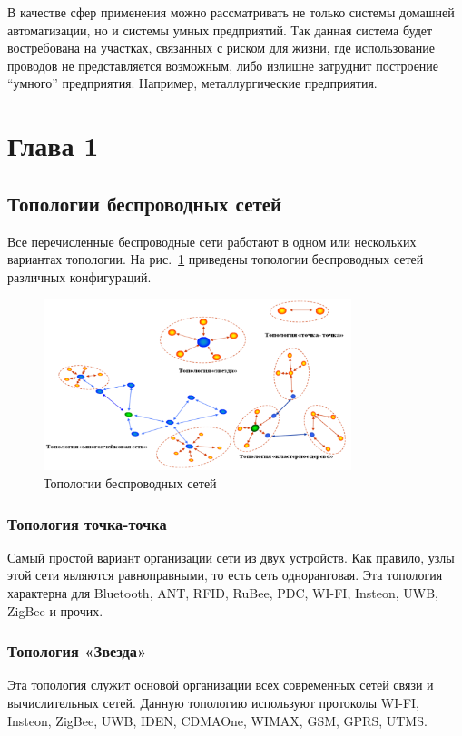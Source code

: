 \documentclass[a4paper,12pt]{article}
\begin{document}
В качестве сфер применения можно рассматривать не только системы домашней автоматизации, но и системы умных предприятий. Так данная система будет востребована на участках, связанных с риском для жизни, где использование проводов не представляется возможным, либо излишне затруднит построение “умного” предприятия. Например, металлургические предприятия.

\newpage

\section{Глава 1}

\subsection{Топологии беспроводных сетей}
Все перечисленные беспроводные сети работают в одном или нескольких вариантах
топологии. На рис.~\ref{fig:topologies} приведены топологии беспроводных сетей различных конфигураций.

\begin{figure}[h]
    \centering
    \includegraphics[width=0.8\textwidth]{images/Fig06.png}
    \caption{Топологии беспроводных сетей}
    \label{fig:topologies}
\end{figure}



\subsubsection{Топология точка-точка}
Самый простой вариант организации сети из двух устройств. Как правило, узлы этой сети являются равноправными, то есть сеть одноранговая.
Эта топология характерна для Bluetooth, ANT, RFID, RuBee, PDC, WI-FI, Insteon, UWB, ZigBee и прочих.

\subsubsection{Топология «Звезда»}
Эта топология служит основой организации всех современных сетей связи и вычислительных сетей. Данную топологию используют протоколы WI-FI, Insteon, ZigBee, UWB, IDEN, CDMAOne, WIMAX, GSM, GPRS, UTMS.
\end{document}
